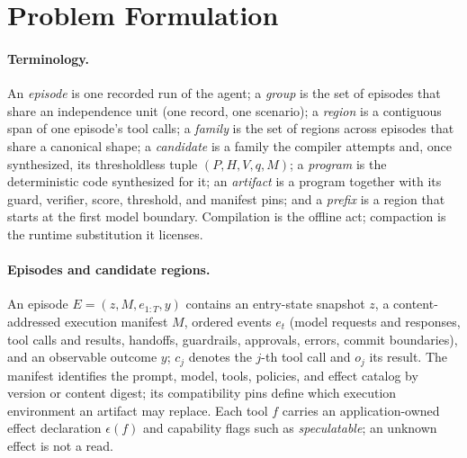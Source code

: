 \section{Problem Formulation}
\label{sec:problem}

\paragraph{Terminology.}
An \emph{episode} is one recorded run of the agent; a \emph{group} is the set
of episodes that share an independence unit (one record, one scenario); a
\emph{region} is a contiguous span of one episode's tool calls; a
\emph{family} is the set of regions across episodes that share a canonical
shape; a \emph{candidate} is a family the compiler attempts and, once
synthesized, its thresholdless tuple $(P,H,V,q,M)$; a
\emph{program} is the deterministic code synthesized for it; an
\emph{artifact} is a program together with its guard, verifier, score,
threshold, and manifest pins; and a \emph{prefix} is a region that starts at
the first model boundary. Compilation is the offline act; compaction is the
runtime substitution it licenses.

\paragraph{Episodes and candidate regions.}
An episode $E=(z,M,e_{1:T},y)$ contains an entry-state snapshot $z$, a
content-addressed execution manifest $M$, ordered events $e_t$ (model requests
and responses, tool calls and results, handoffs, guardrails, approvals, errors,
commit boundaries), and an observable outcome $y$; $c_j$ denotes the $j$-th tool
call and $o_j$ its result. The manifest identifies the prompt, model, tools,
policies, and effect catalog by version or content digest; its compatibility
pins define which execution environment an artifact may replace.
Each tool $f$ carries an
application-owned effect declaration $\epsilon(f)$ and capability flags such as
\emph{speculatable}; an unknown effect is not a read.

